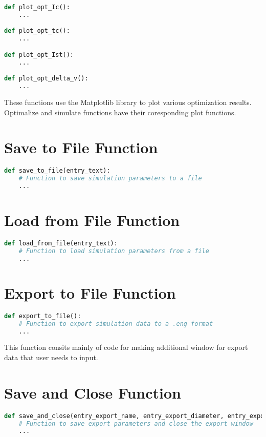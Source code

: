 \documentclass{report}
\begin{document}
\begin{lstlisting}[language=Python]
def plot_opt_Ic():
    ...

def plot_opt_tc():
    ...

def plot_opt_Ist():
    ...

def plot_opt_delta_v():
    ...
\end{lstlisting}

These functions use the Matplotlib library to plot various optimization results. Optimalize and simulate functions have their coresponding plot functions.


\section{Save to File Function}

\begin{lstlisting}[language=Python]
def save_to_file(entry_text):
    # Function to save simulation parameters to a file
    ...
\end{lstlisting}

\section{Load from File Function}

\begin{lstlisting}[language=Python]
def load_from_file(entry_text):
    # Function to load simulation parameters from a file
    ...
\end{lstlisting}

\section{Export to File Function}

\begin{lstlisting}[language=Python]
def export_to_file():
    # Function to export simulation data to a .eng format
    ...
\end{lstlisting}
This function consits mainly of code for making additional window for export data that user needs to input.

\section{Save and Close Function}

\begin{lstlisting}[language=Python]
def save_and_close(entry_export_name, entry_export_diameter, entry_export_lenght, entry_export_man, window):
    # Function to save export parameters and close the export window
    ...
\end{lstlisting}
\end{document}
